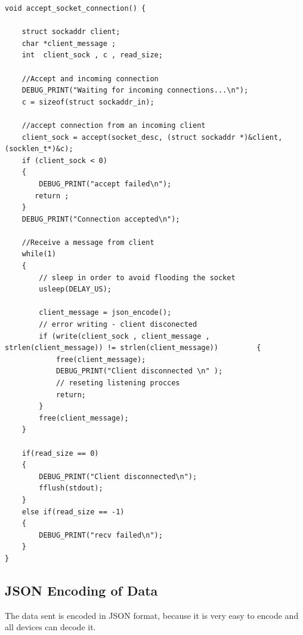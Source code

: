 \lstset{numbers=none, mathescape=true, nolol=false,caption=Data Collection use of mutex,label=lst:task}
\begin{lstlisting}
void accept_socket_connection() {
	
    struct sockaddr client;
    char *client_message ;
	int  client_sock , c , read_size;

    //Accept and incoming connection
    DEBUG_PRINT("Waiting for incoming connections...\n");
    c = sizeof(struct sockaddr_in);
     
    //accept connection from an incoming client
    client_sock = accept(socket_desc, (struct sockaddr *)&client, (socklen_t*)&c);
    if (client_sock < 0)
    {
        DEBUG_PRINT("accept failed\n");
       return ;
    }
    DEBUG_PRINT("Connection accepted\n");
     
    //Receive a message from client 
	while(1)    
	{	
		// sleep in order to avoid flooding the socket
		usleep(DELAY_US);
 
		client_message = json_encode();
		// error writing - client disconected
		if (write(client_sock , client_message , strlen(client_message)) != strlen(client_message)) 		{		
			free(client_message);
        	DEBUG_PRINT("Client disconnected \n" );
			// reseting listening procces			
			return;
		}
		free(client_message);
    }
     
    if(read_size == 0)
    {
        DEBUG_PRINT("Client disconnected\n");
        fflush(stdout);
    }
    else if(read_size == -1)
    {
        DEBUG_PRINT("recv failed\n");
    }
} 
\end{lstlisting}
 
\subsection{JSON Encoding of Data}

The data sent is encoded in JSON format, because it is very easy to encode and all devices can decode it.

